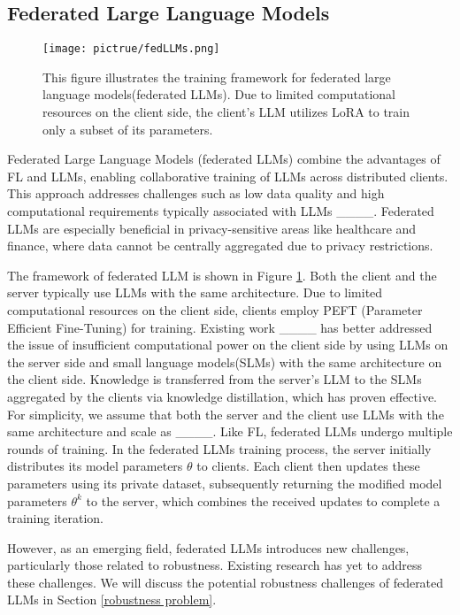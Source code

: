 \subsection{Federated Large Language Models}
\begin{figure}[htbp]  %
    \centering
    \texttt{[image: pictrue/fedLLMs.png]}  %
    \caption{This figure illustrates the training framework for federated large language models(federated LLMs). Due to limited computational resources on the client side, the client's LLM utilizes LoRA to train only a subset of its parameters.}  %
    \label{fig:example}  %
\end{figure}


Federated Large Language Models (federated LLMs) combine the advantages of FL and LLMs, enabling collaborative training of LLMs across distributed clients. This approach addresses challenges such as low data quality and high computational requirements typically associated with LLMs ____. Federated LLMs are especially beneficial in privacy-sensitive areas like healthcare and finance, where data cannot be centrally aggregated due to privacy restrictions.

The framework of federated LLM is shown in Figure \ref{fig:example}. Both the client and the server typically use LLMs with the same architecture. Due to limited computational resources on the client side, clients employ PEFT (Parameter Efficient Fine-Tuning) for training. Existing work ____ has better addressed the issue of insufficient computational power on the client side by using LLMs on the server side and small language models(SLMs) with the same architecture on the client side. Knowledge is transferred from the server's LLM to the SLMs aggregated by the clients via knowledge distillation, which has proven effective. For simplicity, we assume that both the server and the client use LLMs with the same architecture and scale as ____. Like FL, federated LLMs undergo multiple rounds of training. In the federated LLMs training process, the server initially distributes its model parameters $\theta$ to clients. Each client then updates these parameters using its private dataset, subsequently returning the modified model parameters $\theta^k$ to the server, which combines the received updates to complete a training iteration.

However, as an emerging field, federated LLMs introduces new challenges, particularly those related to robustness. Existing research has yet to address these challenges. We will discuss the potential robustness challenges of federated LLMs in Section \ref{robustness problem}.



